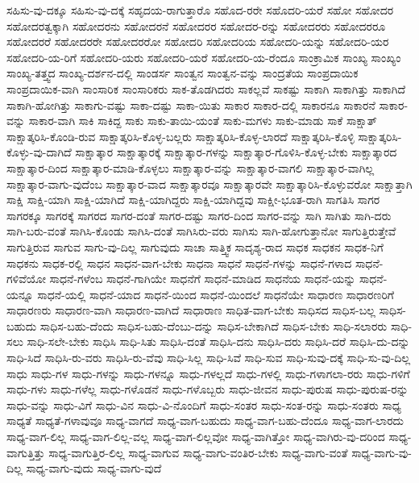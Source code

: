 {ಸಹಿಸು-ವು-ದಕ್ಕೂ
ಸಹಿಸು-ವು-ದಕ್ಕೆ
ಸಹೃದಯ-ರಾಗುತ್ತಾರೊ
ಸಹೊದ-ರರೇ
ಸಹೊದರಿ-ಯರೆ
ಸಹೋ
ಸಹೋದರ
ಸಹೋದರತ್ವಕ್ಕಾಗಿ
ಸಹೋದರನು
ಸಹೋದರನೆ
ಸಹೋದರರ
ಸಹೋದರ-ರನ್ನು
ಸಹೋದರರು
ಸಹೋದರರೂ
ಸಹೋದರರೆ
ಸಹೋದರರೇ
ಸಹೋದರರೋ
ಸಹೋದರಿ
ಸಹೋದರಿಯ
ಸಹೋದರಿ-ಯನ್ನು
ಸಹೋದರಿ-ಯರ
ಸಹೋದರಿ-ಯ-ರಿಗೆ
ಸಹೋದರಿ-ಯರು
ಸಹೋದರಿ-ಯರೆ
ಸಹೋದರಿ-ಯ-ರೆಂದೂ
ಸಾಂಕ್ರಾಮಿಕ
ಸಾಂಖ್ಯ
ಸಾಂಖ್ಯಂ
ಸಾಂಖ್ಯ-ತತ್ತ್ವದ
ಸಾಂಖ್ಯ-ದರ್ಶನ-ದಲ್ಲಿ
ಸಾಂಡರ್ಸ
ಸಾಂತ್ವನ
ಸಾಂತ್ವನ-ವನ್ನು
ಸಾಂದ್ರತೆಯ
ಸಾಂಪ್ರದಾಯಿಕ
ಸಾಂಪ್ರದಾಯಿಕ-ವಾಗಿ
ಸಾಂಸಾರಿಕ
ಸಾಂಸಾರಿಕರು
ಸಾಕ-ತೊಡಗಿದರು
ಸಾಕಲ್ಲವೆ
ಸಾಕಷ್ಟು
ಸಾಕಾಗಿ
ಸಾಕಾಗಿತ್ತು
ಸಾಕಾಗಿದೆ
ಸಾಕಾಗಿ-ಹೋಗಿತ್ತು
ಸಾಕಾಗು-ವಷ್ಟು
ಸಾಕಾ-ದಷ್ಟು
ಸಾಕಾ-ಯಿತು
ಸಾಕಾರ
ಸಾಕಾರ-ದಲ್ಲಿ
ಸಾಕಾರನೂ
ಸಾಕಾರನೆ
ಸಾಕಾರ-ವನ್ನು
ಸಾಕಾರ-ವಾಗಿ
ಸಾಕಿ
ಸಾಕಿದ್ದ
ಸಾಕು
ಸಾಕು-ತಾಯಿ-ಯಂತೆ
ಸಾಕು-ಮಗಳು
ಸಾಕು-ಮಾಡು
ಸಾಕೆ
ಸಾಕ್ಷಾತ್
ಸಾಕ್ಷಾತ್ಕರಿಸಿ-ಕೊಂಡಿ-ರುವ
ಸಾಕ್ಷಾತ್ಕರಿಸಿ-ಕೊಳ್ಳ-ಬಲ್ಲರು
ಸಾಕ್ಷಾತ್ಕರಿಸಿ-ಕೊಳ್ಳ-ಲಾರದೆ
ಸಾಕ್ಷಾತ್ಕರಿಸಿ-ಕೊಳ್ಳಿ
ಸಾಕ್ಷಾತ್ಕರಿಸಿ-ಕೊಳ್ಳು-ವು-ದಾಗಿದೆ
ಸಾಕ್ಷಾತ್ಕಾರ
ಸಾಕ್ಷಾತ್ಕಾರಕ್ಕೆ
ಸಾಕ್ಷಾತ್ಕಾರ-ಗಳನ್ನು
ಸಾಕ್ಷಾತ್ಕಾರ-ಗೊಳಿಸಿ-ಕೊಳ್ಳ-ಬೇಕು
ಸಾಕ್ಷಾತ್ಕಾರದ
ಸಾಕ್ಷಾತ್ಕಾರ-ದಿಂದ
ಸಾಕ್ಷಾತ್ಕಾರ-ಮಾಡಿ-ಕೊಳ್ಳಲು
ಸಾಕ್ಷಾತ್ಕಾರ-ವನ್ನು
ಸಾಕ್ಷಾತ್ಕಾರ-ವಾಗಲಿ
ಸಾಕ್ಷಾತ್ಕಾರ-ವಾಗಿಲ್ಲ
ಸಾಕ್ಷಾತ್ಕಾರ-ವಾಗು-ವುದೆಂಬ
ಸಾಕ್ಷಾತ್ಕಾರ-ವಾದ
ಸಾಕ್ಷಾತ್ಕಾರವೂ
ಸಾಕ್ಷಾತ್ಕಾರವೇ
ಸಾಕ್ಷಾತ್ಕಾರಿಸಿ-ಕೊಳ್ಳುವರೋ
ಸಾಕ್ಷಾತ್ತಾಗಿ
ಸಾಕ್ಷಿ
ಸಾಕ್ಷಿ-ಯಾಗಿ
ಸಾಕ್ಷಿ-ಯಾಗಿದೆ
ಸಾಕ್ಷಿ-ಯಾಗಿದ್ದರು
ಸಾಕ್ಷಿ-ಯಾಗಿದ್ದವು
ಸಾಕ್ಷೀ-ಭೂತ-ರಾಗಿ
ಸಾಗತಿಸಿ
ಸಾಗರ
ಸಾಗರಕ್ಕೂ
ಸಾಗರಕ್ಕೆ
ಸಾಗರದ
ಸಾಗರ-ದಂತೆ
ಸಾಗರ-ದಷ್ಟು
ಸಾಗರ-ದಿಂದ
ಸಾಗರ-ವನ್ನು
ಸಾಗಿ
ಸಾಗಿತು
ಸಾಗಿ-ದರು
ಸಾಗಿ-ಬರು-ವಂತೆ
ಸಾಗಿಸಿ-ಕೊಂಡು
ಸಾಗಿಸಿ-ದಂತೆ
ಸಾಗಿಸಿರು-ವರು
ಸಾಗಿಸು
ಸಾಗಿ-ಹೋಗುತ್ತಾನೋ
ಸಾಗುತ್ತಿರುತ್ತೇವೆ
ಸಾಗುತ್ತಿರುವ
ಸಾಗುವ
ಸಾಗು-ವು-ದಿಲ್ಲ
ಸಾಗುವುದು
ಸಾಚಾ
ಸಾತ್ತ್ವಿಕ
ಸಾದೃಶ್ಯ-ರಾದ
ಸಾಧಕ
ಸಾಧಕನ
ಸಾಧಕ-ನಿಗೆ
ಸಾಧಕನು
ಸಾಧಕ-ರಲ್ಲಿ
ಸಾಧನ
ಸಾಧನ-ವಾಗ-ಬೇಕು
ಸಾಧನಾ
ಸಾಧನೆ
ಸಾಧನೆ-ಗಳನ್ನು
ಸಾಧನೆ-ಗಳಾದ
ಸಾಧನೆ-ಗಳಿವೆಯೋ
ಸಾಧನೆ-ಗಳೆಂಬ
ಸಾಧನೆ-ಗಾಗಿಯೇ
ಸಾಧನೆಗೆ
ಸಾಧನೆ-ಮಾಡಿದ
ಸಾಧನೆಯ
ಸಾಧನೆ-ಯನ್ನು
ಸಾಧನೆ-ಯನ್ನೂ
ಸಾಧನೆ-ಯಲ್ಲಿ
ಸಾಧನೆ-ಯಾದ
ಸಾಧನೆ-ಯಿಂದ
ಸಾಧನೆ-ಯಿಂದಲೆ
ಸಾಧನೆಯೇ
ಸಾಧಾರಣ
ಸಾಧಾರಣರಿಗೆ
ಸಾಧಾರಣರು
ಸಾಧಾರಣ-ವಾಗಿ
ಸಾಧಾರಣ-ವಾಗಿದೆ
ಸಾಧಾರಾಣ
ಸಾಧಿತ-ವಾಗ-ಬೇಕು
ಸಾಧಿಸದ
ಸಾಧಿಸ-ಬಲ್ಲ
ಸಾಧಿಸ-ಬಹುದು
ಸಾಧಿಸ-ಬಹು-ದೆಂದು
ಸಾಧಿಸ-ಬಹು-ದೆಂಬು-ದನ್ನು
ಸಾಧಿಸ-ಬೇಕಾಗಿದೆ
ಸಾಧಿಸ-ಬೇಕು
ಸಾಧಿ-ಸಲಾರರು
ಸಾಧಿ-ಸಲು
ಸಾಧಿ-ಸಲೇ-ಬೇಕು
ಸಾಧಿಸಿ
ಸಾಧಿ-ಸಿತು
ಸಾಧಿಸಿ-ದಂತೆ
ಸಾಧಿಸಿ-ದನು
ಸಾಧಿಸಿ-ದರು
ಸಾಧಿಸಿ-ದರೆ
ಸಾಧಿಸಿ-ದು-ದನ್ನು
ಸಾಧಿ-ಸಿದೆ
ಸಾಧಿಸಿ-ರು-ವರು
ಸಾಧಿಸಿ-ರು-ವೆವು
ಸಾಧಿ-ಸಿಲ್ಲ
ಸಾಧಿ-ಸಿವೆ
ಸಾಧಿ-ಸುವ
ಸಾಧಿ-ಸುವು-ದಕ್ಕೆ
ಸಾಧಿ-ಸು-ವು-ದಿಲ್ಲ
ಸಾಧು
ಸಾಧು-ಗಳ
ಸಾಧು-ಗಳನ್ನು
ಸಾಧು-ಗಳನ್ನೂ
ಸಾಧು-ಗಳಲ್ಲದೆ
ಸಾಧು-ಗಳಲ್ಲಿ
ಸಾಧು-ಗಳಾಗಲಾ-ರರು
ಸಾಧು-ಗಳಿಗೆ
ಸಾಧು-ಗಳು
ಸಾಧು-ಗಳೆಲ್ಲ
ಸಾಧು-ಗಳೊಡನೆ
ಸಾಧು-ಗಳೊಬ್ಬರು
ಸಾಧು-ಜೀವನ
ಸಾಧು-ಪುರುಷ
ಸಾಧು-ಪುರುಷ-ರನ್ನು
ಸಾಧು-ವನ್ನು
ಸಾಧು-ವಿಗೆ
ಸಾಧು-ವಿನ
ಸಾಧು-ವಿ-ನೊಂದಿಗೆ
ಸಾಧು-ಸಂತರ
ಸಾಧು-ಸಂತ-ರನ್ನು
ಸಾಧು-ಸಂತರು
ಸಾಧ್ಯ
ಸಾಧ್ಯತೆ
ಸಾಧ್ಯತೆ-ಗಳಾವುವೂ
ಸಾಧ್ಯ-ವಾಗದೆ
ಸಾಧ್ಯ-ವಾಗ-ಬಹುದು
ಸಾಧ್ಯ-ವಾಗ-ಬಹು-ದೆಂದೂ
ಸಾಧ್ಯ-ವಾಗ-ಲಾರದು
ಸಾಧ್ಯ-ವಾಗ-ಲಿಲ್ಲ
ಸಾಧ್ಯ-ವಾಗ-ಲಿಲ್ಲ-ವಲ್ಲ
ಸಾಧ್ಯ-ವಾಗ-ಲಿಲ್ಲವೋ
ಸಾಧ್ಯ-ವಾಗಿತ್ತೋ
ಸಾಧ್ಯ-ವಾಗಿರು-ವು-ದರಿಂದ
ಸಾಧ್ಯ-ವಾಗುತ್ತಿತ್ತು
ಸಾಧ್ಯ-ವಾಗುತ್ತಿರ-ಲಿಲ್ಲ
ಸಾಧ್ಯ-ವಾಗುವ
ಸಾಧ್ಯ-ವಾಗು-ವಂತಿರ-ಬೇಕು
ಸಾಧ್ಯ-ವಾಗು-ವಂತೆ
ಸಾಧ್ಯ-ವಾಗು-ವು-ದಿಲ್ಲ
ಸಾಧ್ಯ-ವಾಗು-ವುದು
ಸಾಧ್ಯ-ವಾಗು-ವುದೆ
}
